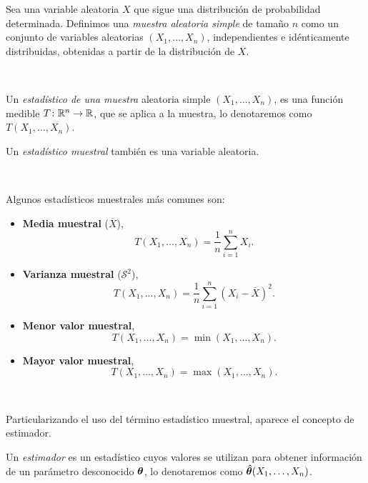 \documentclass[oneside,openright,titlepage,numbers=noenddot,openany,headinclude,footinclude=true,
cleardoublepage=empty,abstractoff,BCOR=5mm,paper=a4,fontsize=12pt,main=spanish]{scrreprt}
\begin{document}
\begin{definition}
Sea una variable aleatoria $X$ que sigue una distribución de probabilidad determinada. Definimos una \textit{muestra aleatoria simple} de tamaño $n$ como un conjunto de variables aleatorias $(X_1,\dots,X_n)$, independientes e idénticamente distribuidas, obtenidas a partir de la distribución de $X$.
\end{definition}\

\begin{definition}
Un \textit{estadístico de una muestra} aleatoria simple $(X_1,\dots,X_n)$, es una función medible $T\colon \mathbb{R}^n \to \mathbb{R}$, que se aplica a la muestra, lo denotaremos como $T(X_1,\dots,X_n)$.\\
\begin{remark}
Un \textit{estadístico muestral} también es una variable aleatoria.
\end{remark}
\end{definition}\

\begin{example}
Algunos estadísticos muestrales más comunes son:
\begin{itemize}
    \item \textbf{Media muestral} ($\overline{X}$), $$ T(X_1,\dots,X_n)=\frac{1}{n}\sum_{i=1}^n X_i.$$
    \item \textbf{Varianza muestral} ($\mathcal{S}^2$),  $$ T(X_1,\dots,X_n)=\frac{1}{n}\sum_{i=1}^n (X_i-\overline{X})^2.$$
    \item \textbf{Menor valor muestral}, $$ T(X_1,\dots,X_n)=\min (X_1,\dots,X_n).$$
    \item \textbf{Mayor valor muestral},  $$ T(X_1,\dots,X_n)=\max (X_1,\dots,X_n).$$
\end{itemize}
\end{example}\

Particularizando el uso del término estadístico muestral, aparece el concepto de estimador.\\

\begin{definition}[Estimador]
Un \textit{estimador} es un estadístico cuyos valores se utilizan para obtener información de un parámetro desconocido $\bm{\theta}$, lo denotaremos como $\bm{\hat{\theta}} (X_1,\dots,X_n)$.
\end{definition}
\end{document}
